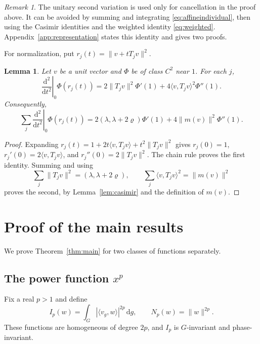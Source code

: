 \documentclass[11pt,reqno]{amsart}
\numberwithin{equation}{section}
\theoremstyle{plain}
\newtheorem{lemma}[theorem]{Lemma}
\theoremstyle{remark}
\newtheorem{remark}[theorem]{Remark}
\newcommand{\rh}{\varrho}
\newcommand{\dd}{\,\mathrm d}
\newcommand{\norm}[1]{\lVert#1\rVert}
\newcommand{\ip}[2]{\langle#1,#2\rangle}
\begin{document}
\begin{remark}\label{rem:representation}
The unitary second variation is used only for cancellation in the proof above.
It can be avoided by summing and integrating \eqref{eq:affineindividual},
then using the Casimir identities and the weighted identity \eqref{eq:weighted}.
Appendix~\ref{app:representation} states this identity and gives two proofs.
\end{remark}

For normalization, put $r_j(t)=\norm{v+tT_jv}^2$.
\begin{lemma}\label{lem:normvariation}
Let $v$ be a unit vector and $\Phi$ be of class $C^2$ near $1$.
For each $j$,
\begin{equation}\label{eq:normindividual}
 \left.\frac{\mathrm d^2}{\mathrm dt^2}\right|_0\Phi(r_j(t))
 =2\norm{T_jv}^2\Phi'(1)+4\ip v{T_jv}^2\Phi''(1).
\end{equation}
Consequently,
\begin{equation}\label{eq:normcomposition}
 \sum_j\left.\frac{\mathrm d^2}{\mathrm dt^2}\right|_0\Phi(r_j(t))
 =2(\lambda,\lambda+2\rh)\Phi'(1)+4\norm{m(v)}^2\Phi''(1).
\end{equation}
\end{lemma}
\begin{proof}
Expanding $r_j(t)=1+2t\ip v{T_jv}+t^2\norm{T_jv}^2$ gives
$r_j(0)=1$, $r_j'(0)=2\ip v{T_jv}$, and
$r_j''(0)=2\norm{T_jv}^2$. The chain rule proves the first identity.
Summing and using
\[
 \sum_j\norm{T_jv}^2=(\lambda,\lambda+2\rh),\qquad
 \sum_j\ip v{T_jv}^2=\norm{m(v)}^2
\]
proves the second, by Lemma~\ref{lem:casimir} and the definition of $m(v)$.
\end{proof}

\section{Proof of the main results}\label{sec:proof}

We prove Theorem~\ref{thm:main} for two classes of functions separately.

\subsection{The power function \texorpdfstring{$x^p$}{x\textasciicircum p}}\label{sec:powers}

Fix a real $p>1$ and define
\begin{equation}\label{eq:IN}
 I_p(w)=\int_G |\ip{v_g}{w}|^{2p}\dd g,\qquad
 N_p(w)=\norm w^{2p}.
\end{equation}
These functions are homogeneous of degree $2p$, and $I_p$ is
$G$-invariant and phase-invariant.
\end{document}
